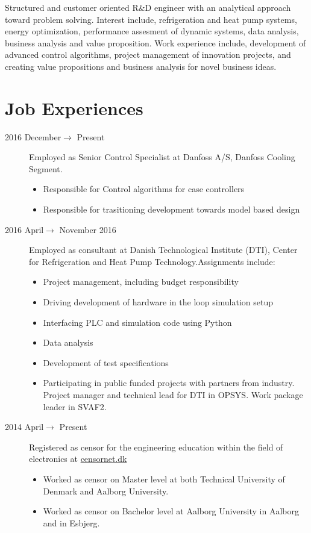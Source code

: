 \documentclass[margin,line,a4paper]{resume}
\begin{document}
\begin{resume}
Structured and customer oriented R\&D engineer with an analytical approach toward problem solving. Interest include, refrigeration and heat pump systems, energy optimization, performance assesment of dynamic systems, data analysis, business analysis and value proposition. Work experience include, development of advanced control algorithms, project management of innovation projects, and creating value propositions and business analysis for novel business ideas.


\section{\mysidestyle Job Experiences}\vspace{1mm}
\begin{description}
\item[2016 December$\rightarrow$ Present] Employed as Senior Control Specialist at Danfoss A/S, Danfoss Cooling Segment.
  \begin{itemize}
  \item Responsible for Control algorithms for case controllers
  \item Responsible for trasitioning development towards model based design
  \end{itemize}
\item[2016 April$\rightarrow$ November 2016] Employed as consultant at Danish Technological Institute (DTI), Center for Refrigeration and Heat Pump Technology.Assignments include:
\begin{itemize}
\item Project management, including budget responsibility  
\item Driving development of hardware in the loop simulation setup
\item Interfacing PLC and simulation code using Python
\item Data analysis
\item Development of test specifications
\item Participating in public funded projects with partners from industry. Project manager and technical lead for DTI in OPSYS. Work package leader in SVAF2.
\end{itemize}
   \item[2014 April$\rightarrow$ Present] Registered as censor for the engineering education within the field of electronics at \href{https://www.censornet.dk/welcome.htm}{censornet.dk}
     \begin{itemize}
     \item Worked as censor on Master level at both Technical University of Denmark and Aalborg University.
     \item Worked as censor on Bachelor level at Aalborg University in Aalborg and in Esbjerg.
     \end{itemize}


\end{description}
\end{resume}
\end{document}
